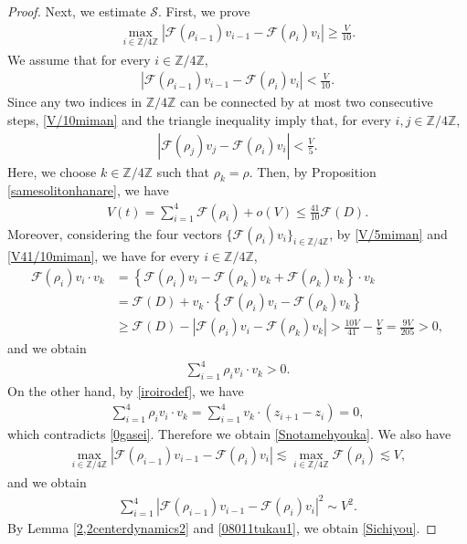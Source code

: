 \documentclass[10pt,a4paper]{amsart}
\numberwithin{equation}{section}
\begin{document}
\begin{proof}
Next, we estimate $\mathcal{S}$. First, we prove 
\begin{align}\label{Snotamehyouka}
\max_{i\in\mathbb{Z}/4\mathbb{Z}}\left|\mathcal{F}(\rho_{i-1})v_{i-1}-\mathcal{F}(\rho_i)v_i\right|\geq \frac{V}{10}.
\end{align}
We assume that for every $i\in\mathbb{Z}/4\mathbb{Z}$,
\begin{align}\label{V/10miman}
\left|\mathcal{F}(\rho_{i-1})v_{i-1}-\mathcal{F}(\rho_i)v_i\right|<\frac{V}{10}.
\end{align}
Since any two indices in $\mathbb{Z}/4\mathbb{Z}$ can be connected by at most two consecutive steps, \eqref{V/10miman} and the triangle inequality imply that, for every $i,j\in\mathbb{Z}/4\mathbb{Z}$,
\begin{align}\label{V/5miman}
\left|\mathcal{F}(\rho_{j})v_{j}-\mathcal{F}(\rho_i)v_i\right|<\frac{V}{5}.
\end{align}
Here, we choose $k\in\mathbb{Z}/4\mathbb{Z}$ such that $\rho_k=\rho$. Then, by Proposition \ref{samesolitonhanare}, we have
\begin{align}\label{V41/10miman}
V(t)=\sum_{i=1}^4\mathcal{F}(\rho_i)+o(V)\leq \frac{41}{10}\mathcal{F}(D).
\end{align}
Moreover, considering the four vectors $\{\mathcal{F}(\rho_i)v_i\}_{i\in\mathbb{Z}/4\mathbb{Z}}$, by \eqref{V/5miman} and \eqref{V41/10miman}, we have for every $i\in\mathbb{Z}/4\mathbb{Z}$,
\begin{align*}
\mathcal{F}(\rho_i)v_i\cdot v_k&=\left\{\mathcal{F}(\rho_i)v_i-\mathcal{F}(\rho_k)v_k+\mathcal{F}(\rho_k)v_k\right\}\cdot v_k
\\
&=\mathcal{F}(D)+v_k\cdot \left\{\mathcal{F}(\rho_i)v_i-\mathcal{F}(\rho_k)v_k\right\}
\\
&\geq \mathcal{F}(D)-\left|\mathcal{F}(\rho_i)v_i-\mathcal{F}(\rho_k)v_k\right|>\frac{10V}{41}-\frac{V}{5}=\frac{9V}{205}>0,
\end{align*}
and we obtain
\begin{align}\label{0gasei}
\sum_{i=1}^4\rho_iv_i\cdot v_k>0.
\end{align}
On the other hand, by \eqref{iroirodef}, we have
\begin{align*}
\sum_{i=1}^4\rho_iv_i\cdot v_k=\sum_{i=1}^4v_k\cdot \left(z_{i+1}-z_i\right)=0,
\end{align*}
which contradicts \eqref{0gasei}. Therefore we obtain \eqref{Snotamehyouka}. We also have
\begin{align*}
\max_{i\in\mathbb{Z}/4\mathbb{Z}}\left|\mathcal{F}(\rho_{i-1})v_{i-1}-\mathcal{F}(\rho_i)v_i\right|\lesssim \max_{i\in\mathbb{Z}/4\mathbb{Z}}\mathcal{F}(\rho_i)\lesssim V,
\end{align*}
and we obtain
\begin{align}\label{08011tukau1}
\sum_{i=1}^4\left|\mathcal{F}(\rho_{i-1})v_{i-1}-\mathcal{F}(\rho_i)v_i\right|^2\sim V^2.
\end{align}
By Lemma \ref{2,2centerdynamics2} and \eqref{08011tukau1}, we obtain \eqref{Sichiyou}.





\end{proof}
\end{document}
